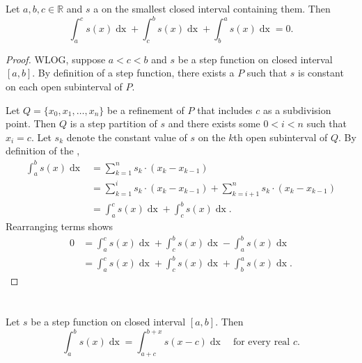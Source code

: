 \documentclass{report}
\begin{document}
\begin{theorem}{1.6}

  Let $a, b, c \in \mathbb{R}$ and $s$ a  on the
    smallest closed interval containing them.
  Then
    $$\int_a^c s(x) \mathop{dx} + \int_c^b s(x) \mathop{dx} +
      \int_b^a s(x) \mathop{dx} = 0.$$

\end{theorem}

\begin{proof}

  WLOG, suppose $a < c < b$ and $s$ be a step function on closed interval
    $[a, b]$.
  By definition of a step function, there exists a 
    $P$ such that $s$ is constant on each open subinterval of $P$.

  Let $Q = \{x_0, x_1, \ldots, x_n\}$ be a refinement of $P$ that includes $c$
    as a subdivision point.
  Then $Q$ is a step partition of $s$ and there exists some $0 < i < n$ such
    that $x_i = c$.
  Let $s_k$ denote the constant value of $s$ on the $k$th open subinterval of
    $Q$.
  By definition of the ,
    \begin{align*}
      \int_a^b s(x) \mathop{dx}
        & = \sum_{k=1}^n s_k \cdot (x_k - x_{k - 1}) \\
        & = \sum_{k=1}^i s_k \cdot (x_k - x_{k - 1}) +
            \sum_{k=i+1}^n s_k \cdot (x_k - x_{k - 1}) \\
        & = \int_a^c s(x) \mathop{dx} + \int_c^b s(x) \mathop{dx}.
    \end{align*}
  Rearranging terms shows
    \begin{align*}
      0
        & = \int_a^c s(x) \mathop{dx} + \int_c^b s(x) \mathop{dx} -
            \int_a^b s(x) \mathop{dx} \\
        & = \int_a^c s(x) \mathop{dx} + \int_c^b s(x) \mathop{dx} +
            \int_b^a s(x) \mathop{dx}.
    \end{align*}

\end{proof}

\section{}%
\label{sec:step-invariance-under-translation}
\label{sec:theorem-1.7}

\begin{theorem}{1.7}

  Let $s$ be a step function on closed interval $[a, b]$.
  Then
    $$\int_a^b s(x) \mathop{dx} =
      \int_{a+c}^{b+x} s(x - c) \mathop{dx} \quad\text{for every real } c.$$

\end{theorem}
\end{document}
